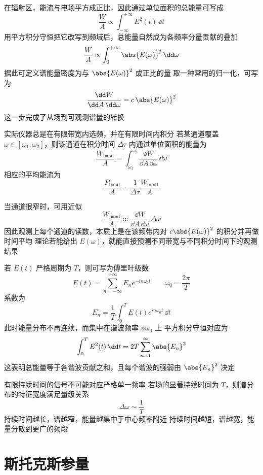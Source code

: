 \begin{derivationnote}
在辐射区，能流与电场平方成正比，因此通过单位面积的总能量可写成
\[
\frac{W}{A}\propto \int_{-\infty}^{+\infty}E^2(t)\,\dd t
\]
用平方积分守恒把它改写到频域后，总能量自然成为各频率分量贡献的叠加
\[
\frac{W}{A}\propto \int_{0}^{+\infty}\abs{E(\omega)}^2\,\dd\omega
\]
据此可定义谱能量密度为与 $\abs{E(\omega)}^2$ 成正比的量  
取一种常用的归一化，可写为
\begin{equation}
\frac{\dd W}{\dd A\,\dd\omega}=c\,\abs{E(\omega)}^2
\end{equation}
这一步完成了从场到可观测谱量的转换
\end{derivationnote}



实际仪器总是在有限带宽内选频，并在有限时间内积分  
若某通道覆盖 $\omega\in[\omega_1,\omega_2]$，则该通道在积分时间 $\Delta\tau$ 内通过单位面积的能量为
\[
\frac{W_{\mathrm{band}}}{A}=\int_{\omega_1}^{\omega_2}\frac{\dd W}{\dd A\,\dd\omega}\,\dd\omega
\]
相应的平均能流为
\begin{equation}
\frac{P_{\mathrm{band}}}{A}=\frac{1}{\Delta\tau}\frac{W_{\mathrm{band}}}{A}
\end{equation}

当通道很窄时，可用近似
\[
\frac{W_{\mathrm{band}}}{A}\approx \frac{\dd W}{\dd A\,\dd\omega}\,\Delta\omega
\]
因此观测上每个通道的读数，本质上是在该频带内对 $c\abs{E(\omega)}^2$ 的积分并再做时间平均  
理论若能给出 $E(\omega)$，就能直接预测不同带宽与不同积分时间下的观测结果


若 $E(t)$ 严格周期为 $T$，则可写为傅里叶级数
\[
E(t)=\sum_{n=-\infty}^{+\infty}E_n e^{-in\omega_0 t}
\qquad
\omega_0=\frac{2\pi}{T}
\]
系数为
\[
E_n=\frac{1}{T}\int_{0}^{T}E(t)e^{in\omega_0 t}\,\dd t
\]
此时能量分布不再连续，而集中在谐波频率 $n\omega_0$ 上  
平方积分守恒对应为
\[
\int_{0}^{T}E^2(t)\,\dd t=2T\sum_{n=1}^{\infty}\abs{E_n}^2
\]
这表明总能量等于各谐波贡献之和，且每个谐波的强弱由 $\abs{E_n}^2$ 决定


有限持续时间的信号不可能对应严格单一频率  
若场的显著持续时间为 $T$，则谱分布的特征宽度满足量级关系
\[
\Delta\omega\sim \frac{1}{T}
\]
持续时间越长，谱越窄，能量越集中于中心频率附近  
持续时间越短，谱越宽，能量分散到更广的频段

\section{斯托克斯参量}


